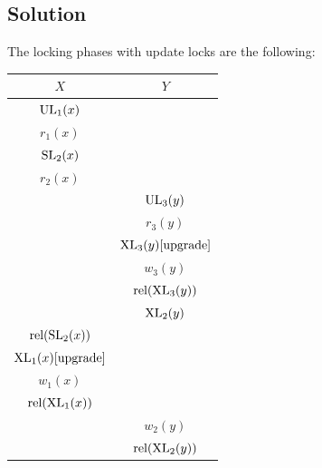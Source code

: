 \documentclass[12pt, a4paper]{report}
\newtheorem[style=M,bodystyle=\normalfont]{theorem}{Theorem}
\newtheorem[style=M,bodystyle=\normalfont]{corollary}{Corollary}
\newtheorem[style=M,bodystyle=\normalfont]{lemma}{Lemma}
\newtheorem[style=M,bodystyle=\normalfont]{definition}{Definition}
\begin{document}
    \subsection*{Solution}
        The locking phases with update locks are the following: 
        \begin{table}[H]
            \centering
            \begin{tabular}{|c|c|}
            \hline
            $X$                                           & $Y$                                           \\ \hline
            $\textnormal{UL}_1(x)$                        &                                               \\
            $r_1(x)$                                      &                                               \\
            $\textnormal{SL}_2(x)$                        &                                               \\
            $r_2(x)$                                      &                                               \\
                                                          & $\textnormal{UL}_3(y)$                        \\
                                                          & $r_3(y)$                                      \\
                                                          & $\textnormal{XL}_3(y) [\textnormal{upgrade}]$ \\
                                                          & $w_3(y)$                                      \\
                                                          & $\textnormal{rel}(\textnormal{XL}_3(y))$      \\
                                                          & $\textnormal{XL}_2(y)$                        \\
            $\textnormal{rel}(\textnormal{SL}_2(x))$      &                                               \\
            $\textnormal{XL}_1(x) [\textnormal{upgrade}]$ &                                               \\
            $w_1(x)$                                      &                                               \\
            $\textnormal{rel}(\textnormal{XL}_1(x))$      &                                               \\
                                                          & $w_2(y)$                                      \\
                                                          & $\textnormal{rel}(\textnormal{XL}_2(y))$      \\ \hline
            \end{tabular}
        \end{table}
\end{document}
